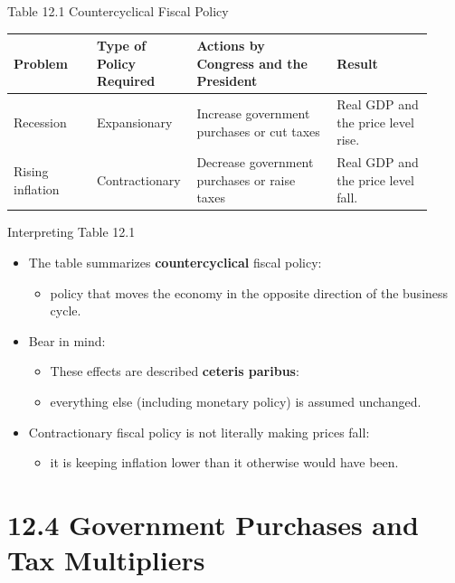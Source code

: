\documentclass[aspectratio=169]{beamer}
\begin{document}
\begin{frame}{Table 12.1 Countercyclical Fiscal Policy}
\transfade
\begin{center}
\small
\begin{tabular}{p{0.19\linewidth} p{0.19\linewidth} p{0.32\linewidth} p{0.22\linewidth}}
\toprule
\textbf{Problem} &
\textbf{Type of Policy Required} &
\textbf{Actions by Congress and the President} &
\textbf{Result} \\
\midrule
Recession &
Expansionary &
Increase government purchases or cut taxes &
Real GDP and the price level rise. \\
Rising inflation &
Contractionary &
Decrease government purchases or raise taxes &
Real GDP and the price level fall. \\
\bottomrule
\end{tabular}
\end{center}
\end{frame}


\begin{frame}{Interpreting Table 12.1}
\transfade
\begin{itemize}[<+->]
  \item The table summarizes \textbf{countercyclical} fiscal policy:
  \begin{itemize}[<+->]
    \item policy that moves the economy in the opposite direction of the business cycle.
  \end{itemize}
  \item Bear in mind:
  \begin{itemize}[<+->]
    \item These effects are described \textbf{ceteris paribus}:
    \item everything else (including monetary policy) is assumed unchanged.
  \end{itemize}
  \item Contractionary fiscal policy is not literally making prices fall:
  \begin{itemize}[<+->]
    \item it is keeping inflation \alert{lower than it otherwise would have been}.
  \end{itemize}
\end{itemize}
\end{frame}

\section{12.4 Government Purchases and Tax Multipliers}
\end{document}

